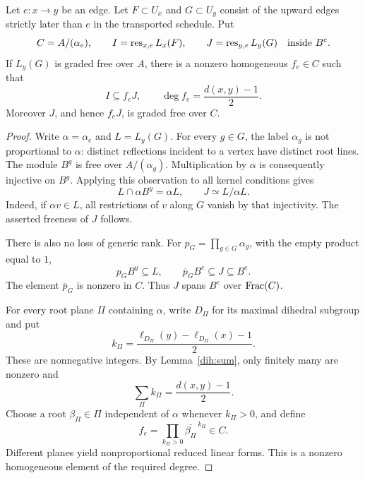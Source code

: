 \begin{proposition}\label{edge:bound}
Let \(e:x\to y\) be an edge. Let \(F\subset U_x\) and \(G\subset U_y\)
consist of the upward edges strictly later than \(e\) in the transported
schedule. Put
\[
 C=A/(\alpha_e),\qquad
 I=\operatorname{res}_{x,e}L_x(F),\qquad J=\operatorname{res}_{y,e}L_y(G)
 \quad\text{inside }B^e .
\]
If \(L_y(G)\) is graded free over \(A\), there is a nonzero homogeneous
\(f_e\in C\) such that
\begin{equation}\label{eq:edge-bound}
 I\subseteq f_eJ,\qquad
 \deg f_e=\frac{d(x,y)-1}{2}.
\end{equation}
Moreover \(J\), and hence \(f_eJ\), is graded free over \(C\).
\end{proposition}
\begin{proof}
Write \(\alpha=\alpha_e\) and \(L=L_y(G)\).
For every \(g\in G\), the label \(\alpha_g\) is not proportional to
\(\alpha\): distinct reflections incident to a vertex have distinct
root lines. The module \(B^g\) is free over \(A/(\alpha_g)\).
Multiplication by \(\alpha\) is consequently injective on \(B^g\).
Applying this observation to all kernel conditions gives
\[
 L\cap\alpha B^y=\alpha L,\qquad J\simeq L/\alpha L.
\]
Indeed, if \(\alpha v\in L\), all restrictions of \(v\) along \(G\)
vanish by that injectivity.
The asserted freeness of \(J\) follows.

There is also no loss of generic rank.
For \(p_G=\prod_{g\in G}\alpha_g\), with the empty product equal to \(1\),
\[
 p_GB^y\subseteq L,\qquad
 \overline p_G B^e\subseteq J\subseteq B^e.
\]
The element \(\overline p_G\) is nonzero in \(C\).
Thus \(J\) spans \(B^e\) over \(\operatorname{Frac}(C)\).

For every root plane \(\Pi\) containing \(\alpha\), write \(D_\Pi\)
for its maximal dihedral subgroup and put
\[
 k_\Pi=\frac{\ell_{D_\Pi}(y)-\ell_{D_\Pi}(x)-1}{2}.
\]
These are nonnegative integers.
By Lemma~\ref{dih:sum}, only finitely many are nonzero and
\[
 \sum_\Pi k_\Pi=\frac{d(x,y)-1}{2}.
\]
Choose a root \(\beta_\Pi\in\Pi\) independent of \(\alpha\) whenever
\(k_\Pi>0\), and define
\[
 f_e=\prod_{k_\Pi>0}\overline{\beta_\Pi}^{\,k_\Pi}\in C .
\]
Different planes yield nonproportional reduced linear forms.
This is a nonzero homogeneous element of the required degree.


\end{proof}
